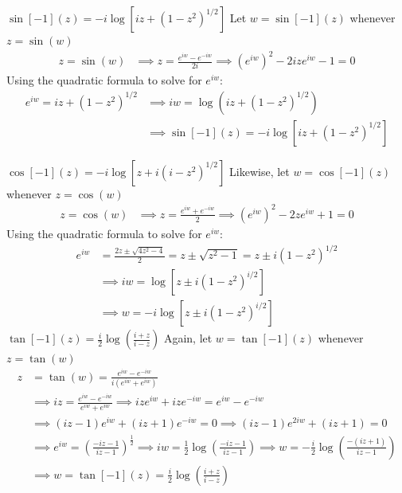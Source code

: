 \documentclass[12pt, english]{book}
\makeatletter
\renewenvironment{proof}[1][\proofname]{\par
	\pushQED{\qed}%
	\normalfont \topsep6\p@\@plus6\p@\relax
	\list{}{%
		\settowidth{\leftmargin}{\itshape\proofname:\hskip\labelsep}%
		\setlength{\labelwidth}{0pt}%
		\setlength{\itemindent}{-\leftmargin}%
	}%
	\item[\hskip\labelsep\itshape#1\@addpunct{:}]\ignorespaces
	}{ \popQED\endlist\@endpefalse}
\makeatother
\begin{document}
	\begin{proof}
	\underline{\(\sin[-1](z) = -i \log[iz + (1-z^2)^{1/2}] \)} \newline
	Let \(w = \sin[-1](z)\) whenever \(z = \sin(w)\)
	\begin{align*}
		z = \sin(w)
		&\implies z = \frac{e^{iw} - e^{-iw}}{2i}
		 \implies (e^{iw})^2 - 2iz e^{iw} - 1 = 0
	\end{align*}
	Using the quadratic formula to solve for \(e^{iw}\): 
	\begin{align*}
		e^{iw} = iz + (1 - z^2)^{1/2} 
		&\implies iw = \log\left( iz + (1 - z^2)^{1/2} \right) \\
		&\implies \sin[-1](z) = -i \log\left[ iz + (1 - z^2)^{1/2} \right]
	\end{align*}

	\underline{\(\cos[-1](z) = -i \log[z + i(i-z^2)^{1/2}]\)} \newline
	{\color{Grey}
	Likewise, let \(w = \cos[-1](z)\) whenever \(z = \cos(w)\)
	\begin{align*}
		z = \cos(w)
		&\implies z = \frac{e^{iw} + e^{-iw}}{2}
		 \implies (e^{iw})^2 - 2ze^{iw} + 1 = 0
	\end{align*}
	Using the quadratic formula to solve for \(e^{iw}\): 
	\begin{align*}
		e^{iw} 
		&= \frac{2z \pm \sqrt{4z^2 - 4}}{2} = z \pm \sqrt{z^2 - 1} = z \pm i (1-z^2)^{1/2} \\
		&\implies iw = \log\left[z \pm i(1-z^2)^{i/2}\right] \\
		&\implies  w = -i\log\left[z \pm i(1-z^2)^{i/2}\right] 
	\end{align*}
	}
	\underline{\(\tan[-1](z) = \frac{i}{2} \log\left(\frac{i + z}{i - z}\right)\)} \newline
	{\color{Grey}
	Again, let \(w = \tan[-1](z)\) whenever \(z = \tan(w)\)
	\begin{align*}
		z &= \tan(w) = \frac{e^{iw} - e^{-iw}}{i(e^{iw} + e^{iw})} \\
		&\implies iz = \frac{e^{iw} - e^{-iw}}{e^{iw} + e^{iw}}
		\implies iz e^{iw} + iz e^{-iw} = e^{iw} - e^{-iw} \\
		&\implies (iz - 1)e^{iw} + (iz + 1)e^{-iw} = 0 
		\implies (iz - 1)e^{2iw} + (iz + 1) = 0 \\
		&\implies e^{iw} = \left(\frac{-iz - 1}{iz - 1}\right)^\frac{1}{2} 
		 \implies iw = \frac{1}{2} \log\left(\frac{-iz - 1}{iz - 1}\right) 
	 	 \implies w = -\frac{i}{2} \log\left(\frac{-(iz + 1)}{iz - 1}\right) \\
		&\implies w = \tan[-1](z) = \frac{i}{2} \log\left(\frac{i + z}{i - z}\right)
	\end{align*}
	}
	\end{proof}
	
\end{document}
